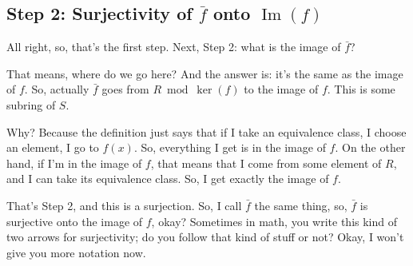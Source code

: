 \begin{proofWrapper}
\subsection{Step 2: Surjectivity of \texorpdfstring{$\bar{f}$}{fbar} onto \texorpdfstring{$\operatorname{Im}(f)$}{Im(f)}}

\begin{speech}[01:02:41 - 01:04:17]
All right, so, that's the first step. Next, Step 2: what is the image of $\bar{f}$?  

That means, where do we go here? And the answer is: it's the same as the image of $f$. So, actually $\bar{f}$ goes from $R \bmod \ker(f)$ to the image of $f$.  This is some subring of $S$.  

Why? Because the definition just says that if I take an equivalence class, I choose an element, I go to $f(x)$. So, everything I get is in the image of $f$. On the other hand, if I'm in the image of $f$, that means that I come from some element of $R$, and I can take its equivalence class. So, I get exactly the image of $f$. 

That's Step 2, and this is a surjection. So, I call $\bar{f}$ the same thing, so, $\bar{f}$ is surjective onto the image of $f$, okay?  Sometimes in math, you write this kind of two arrows for surjectivity; do you follow that kind of stuff or not? Okay, I won't give you more notation now.
\end{speech}

\begin{content}


\end{content}
\end{proofWrapper}
